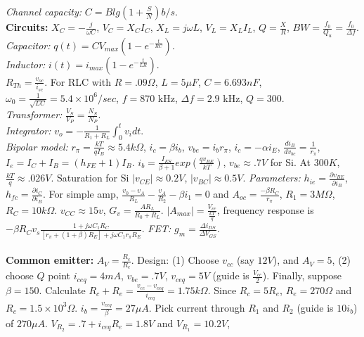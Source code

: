 \emph{Channel capacity:} $C= B lg(1+{\frac S N}) b/s$.
\\
{\bf Circuits:}
$X_C= -{\frac j {\omega C}}$, $V_C= X_C I_C$,
$X_L=  j \omega L$, $V_L= X_L I_L$,
$Q= {\frac X R}$, $BW= {\frac {f_0} {Q_u}} =
{\frac {f_0} {\Delta f}}$. \\
\emph{Capacitor:} $q(t)= C V_{max} (1-e^{- {\frac t {RC}}})$. \\
\emph{Inductor:} $i(t)= i_{max} (1-e^{- {\frac t {LR}}})$. \\
$R_{Th}= {\frac {v_{oc}} {i_{sc}}}$.
For RLC with $R=.09 \Omega$, $L= 5 \mu F$, $C= 6.693 nF$,
$\omega_0 = {\frac 1 {\sqrt {LC}}}= 5.4 \times 10^6 /sec$, $f= 870$ kHz, $\Delta f= 2.9$ kHz,
$Q= 300$.   \\
\emph{Transformer:} ${\frac {V_S}{V_P}}= {\frac {N_S}{N_P}}$. \\
\emph{Integrator:} $v_o= - {\frac 1 {R_1+R_L}} \int_0^t v_i dt$. \\
\emph{Bipolar model: }
$r_{\pi} = {\frac {kT}{qI_B}} \approx 5.4 k \Omega$, $i_c= \beta i_b$, $v_{be}= i_b r_{\pi}$,
$i_c= - \alpha i_E$, ${\frac {d i_B}{dv_{bc}}}= {\frac 1 {r_{\pi}}}$,
$I_e= I_C + I_B= (h_{FE}+1)I_B$.
$i_b= {\frac {I_{ES} } {\beta + 1}} exp({\frac {qv_{BE}} {kT}})$, $v_{be} \approx .7V$ for Si.
At $300K$, ${\frac {kT}{q}} \approx .026V$.  Saturation for Si 
$|v_{CE}| \approx 0.2V$, $|v_{BC}| \approx 0.5V$. 
\emph{Parameters:} $h_{ie}= {\frac {\partial v_{BE}} {\partial i_B}}$,
$h_{fc}= {\frac {\partial i_C} {\partial i_B}}$.
For simple amp, ${\frac {v_0 - v_A} {R_L}} - {\frac {v_A} {R_2}} - \beta i_1 = 0$ and
$A_{oc}= {\frac {- \beta R_C} {r_{\pi}}}$, 
$R_1= 3 M \Omega$, $R_C = 10 k \Omega$. $v_{CC} \approx 15v$,
$G_v= {\frac {A R_L} {R_0 + R_L}}$.  $|A_{max}|= {\frac {V_{cc}} {\frac {kT} {q}}}$,
frequency response is $- \beta R_C v_s {\frac {1+j \omega C_1 R_C}
{[r_{\pi}+ (1+\beta)R_E]+j \omega C_1 r_{\pi} R_E}}$.  
\emph{FET:} $g_m= {\frac {\Delta i_{DS}} {\Delta V_{GS}}}$.
\\
\\
{\bf Common emitter:} 
$A_V = {\frac {R_c} {R_e}}$.
Design: (1) Choose $v_{cc}$ (say $12V$), and $A_V= 5$, 
(2) choose $Q$ point $i_{ceq} = 4 mA$, $v_{be}=.7V$, $v_{ceq}=5V$ (guide is ${\frac {V_{cc}} 2}$). Finally,
suppose $\beta = 150$.
Calculate $R_c + R_e = {\frac {v_{cc} - v_{ceq}} {i_{ceq}}} = 1.75 k \Omega$.
Since $R_c = 5 R_e$, $R_e = 270 \Omega$ and
$R_c = 1.5 \times 10^3 \Omega$.  $i_b = {\frac {v_{ceq}} {\beta}} = 27 \mu A$.
Pick current through $R_1$ and $R_2$ (guide is $10 i_b$) of $270 \mu A$.
$V_{R_2} = .7 + i_{ceq}R_e = 1.8V$ and $V_{R_1} = 10.2V$,
